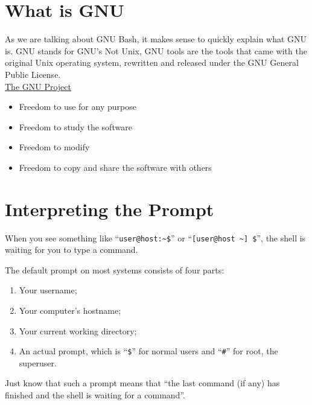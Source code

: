 \documentclass{extbook}
\begin{document}
\section{What is GNU}

As we are talking about GNU Bash, it makes sense to quickly explain what GNU is. GNU stands for GNU's Not Unix, GNU tools are the tools that came with the original Unix operating system, rewritten and released under the GNU General Public License.\\

\href{https://www.gnu.org/}{The GNU Project}

\begin{itemize}
\item Freedom to use for any purpose
\item Freedom to study the software
\item Freedom to modify
\item Freedom to copy and share the software with others
\end{itemize}

\section{Interpreting the Prompt}

When you see something like ``\verb|user@host:~$|'' or ``\verb|[user@host ~] $|'', the shell is waiting for you to type a command.

The default prompt on most systems consists of four parts:
\begin{enumerate}
\item Your username;
\item Your computer's hostname;
\item Your current working directory;
\item An actual prompt, which is ``\verb|$|'' for normal users and ``\verb|#|'' for root, the superuser.
\end{enumerate}


Just know that such a prompt means that ``the last command (if any) has finished and the shell is waiting for a command''.
\end{document}
